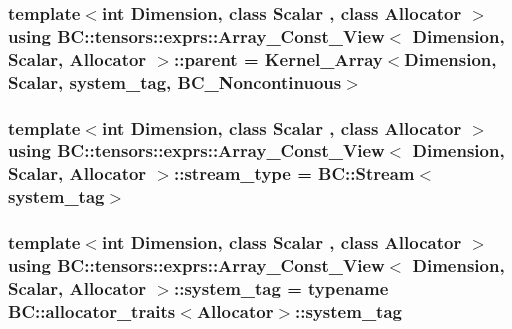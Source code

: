 \subsubsection[{\texorpdfstring{parent}{parent}}]{\setlength{\rightskip}{0pt plus 5cm}template$<$int Dimension, class Scalar , class Allocator $>$ using {\bf B\+C\+::tensors\+::exprs\+::\+Array\+\_\+\+Const\+\_\+\+View}$<$ Dimension, {\bf Scalar}, {\bf Allocator} $>$\+::{\bf parent} =  {\bf Kernel\+\_\+\+Array}$<$Dimension, {\bf Scalar}, {\bf system\+\_\+tag}, {\bf B\+C\+\_\+\+Noncontinuous}$>$}\hypertarget{structBC_1_1tensors_1_1exprs_1_1Array__Const__View_ab5bec1e932c07d5980709326ea33c680}{}\label{structBC_1_1tensors_1_1exprs_1_1Array__Const__View_ab5bec1e932c07d5980709326ea33c680}
\subsubsection[{\texorpdfstring{stream\+\_\+type}{stream_type}}]{\setlength{\rightskip}{0pt plus 5cm}template$<$int Dimension, class Scalar , class Allocator $>$ using {\bf B\+C\+::tensors\+::exprs\+::\+Array\+\_\+\+Const\+\_\+\+View}$<$ Dimension, {\bf Scalar}, {\bf Allocator} $>$\+::{\bf stream\+\_\+type} =  {\bf B\+C\+::\+Stream}$<${\bf system\+\_\+tag}$>$}\hypertarget{structBC_1_1tensors_1_1exprs_1_1Array__Const__View_a8bb694230cd6fd0ff0f5b5cbe667614a}{}\label{structBC_1_1tensors_1_1exprs_1_1Array__Const__View_a8bb694230cd6fd0ff0f5b5cbe667614a}
\subsubsection[{\texorpdfstring{system\+\_\+tag}{system_tag}}]{\setlength{\rightskip}{0pt plus 5cm}template$<$int Dimension, class Scalar , class Allocator $>$ using {\bf B\+C\+::tensors\+::exprs\+::\+Array\+\_\+\+Const\+\_\+\+View}$<$ Dimension, {\bf Scalar}, {\bf Allocator} $>$\+::{\bf system\+\_\+tag} =  typename {\bf B\+C\+::allocator\+\_\+traits}$<${\bf Allocator}$>$\+::{\bf system\+\_\+tag}}\hypertarget{structBC_1_1tensors_1_1exprs_1_1Array__Const__View_aafde0c1500b6b71d2d964f04b55266a1}{}\label{structBC_1_1tensors_1_1exprs_1_1Array__Const__View_aafde0c1500b6b71d2d964f04b55266a1}



